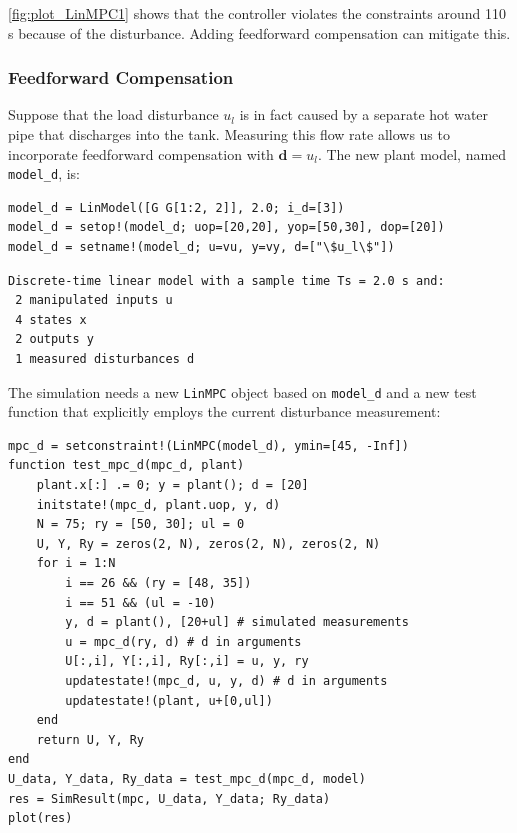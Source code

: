 \cref{fig:plot_LinMPC1} shows that the controller violates the constraints around 110 s because of the disturbance. Adding feedforward compensation can mitigate this.

\subsubsection{Feedforward Compensation}

Suppose that the load disturbance $u_l$ is in fact caused by a separate hot water pipe that discharges into the tank. Measuring this flow rate allows us to incorporate feedforward compensation with $\mathbf{d}=u_l$. The new plant model, named \texttt{model\_d}, is:
\begin{verbatim}
model_d = LinModel([G G[1:2, 2]], 2.0; i_d=[3])
model_d = setop!(model_d; uop=[20,20], yop=[50,30], dop=[20])
model_d = setname!(model_d; u=vu, y=vy, d=["\$u_l\$"])
\end{verbatim}
\spacerepl
\begin{verbatim}
Discrete-time linear model with a sample time Ts = 2.0 s and:
 2 manipulated inputs u
 4 states x
 2 outputs y
 1 measured disturbances d
\end{verbatim}
The simulation needs a new \texttt{LinMPC} object based on \texttt{model\_d} and a new test function that explicitly employs the current disturbance measurement:
\begin{verbatim}
mpc_d = setconstraint!(LinMPC(model_d), ymin=[45, -Inf])
function test_mpc_d(mpc_d, plant)
    plant.x[:] .= 0; y = plant(); d = [20]
    initstate!(mpc_d, plant.uop, y, d)
    N = 75; ry = [50, 30]; ul = 0
    U, Y, Ry = zeros(2, N), zeros(2, N), zeros(2, N)
    for i = 1:N
        i == 26 && (ry = [48, 35])
        i == 51 && (ul = -10)
        y, d = plant(), [20+ul] # simulated measurements
        u = mpc_d(ry, d) # d in arguments
        U[:,i], Y[:,i], Ry[:,i] = u, y, ry
        updatestate!(mpc_d, u, y, d) # d in arguments
        updatestate!(plant, u+[0,ul])
    end
    return U, Y, Ry
end
U_data, Y_data, Ry_data = test_mpc_d(mpc_d, model)
res = SimResult(mpc, U_data, Y_data; Ry_data)
plot(res)
\end{verbatim}

